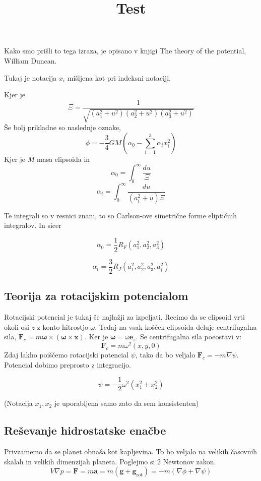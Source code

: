 \documentclass{article}
\theoremstyle{definition}
\theoremstyle{plain}
\numberwithin{definition}{section}
\numberwithin{theorem}{section} \title{Test}
\begin{document}
Kako smo prišli to tega izraza, je opisano v knjigi 
The theory of the potential, William Duncan.

Tukaj je notacija $x_i$ mišljena kot pri indeksni notaciji.

Kjer je 
$$\Xi = \frac{1}{\sqrt{(a_1^2 + u^2)(a_2^2 + u^2)(a_3^2 + u^2)}}$$
Še bolj prikladne so naslednje oznake,
$$\phi = -\frac{3}{4} G M \left(\alpha_0 - \sum_{i=1}^{3} \alpha_i x_i^2 \right)$$
Kjer je $M$ masa elipsoida in 
$$\alpha_0 = \int_0^{\infty} \frac{du}{\Xi}$$
$$\alpha_i = \int_0^{\infty} \frac{du}{(a_i^2 + u)\Xi}$$


Te integrali so v resnici znani, to so Carlson-ove simetrične forme
eliptičnih integralov. In sicer

$$\alpha_0 = \frac{1}{2} R_{F}(a_1^2,a_2^2,a_3^2)$$

$$\alpha_i = \frac{3}{2} R_{J}(a_1^2,a_2^2,a_3^2,a_i^2)$$

\subsection{Teorija za rotacijskim potencialom}
Rotacijski potencial je tukaj še najlažji za izpeljati. Recimo da se elipsoid
vrti okoli osi $z$ z konto hitrostjo $\omega$. Tedaj na vsak košček elipsoida
deluje centrifugalna sila, 
$\boldsymbol{F}_c = m \boldsymbol{\omega} \times (\boldsymbol{\omega} \times \boldsymbol{x})$.
Ker je $\boldsymbol{\omega} = \omega \boldsymbol{e}_{z}$. Se centrifugalna
sila poeostavi v:
$$\boldsymbol{F}_{c} = m \omega^2 (x, y, 0)$$
Zdaj lakho poiščemo rotacijski potencial $\psi$,
tako da bo veljalo $\boldsymbol{F}_{c} = - m \nabla \psi$. Potencial dobimo 
preprosto z integracijo. 

$$\psi = - \frac{1}{2} \omega^2(x_1^2 + x_2^2)$$

(Notacija $x_1, x_2$ je uporabljena samo zato da sem konsistenten)

\subsection{Reševanje hidrostatske enačbe}
Privzamemo da se planet obnaša kot kapljevina. To bo veljalo na velikih
časovnih skalah in velikih dimenzijah planeta.
Poglejmo si 2 Newtonov zakon.
\begin{equation} \label{eq: newton}	
	V \nabla p
	= \boldsymbol{F} = m \boldsymbol{a} = m (\boldsymbol{g} + \boldsymbol{g}_{\text{rot}}) = 
	-m (\nabla \phi + \nabla \psi)
\end{equation}
\end{document}
